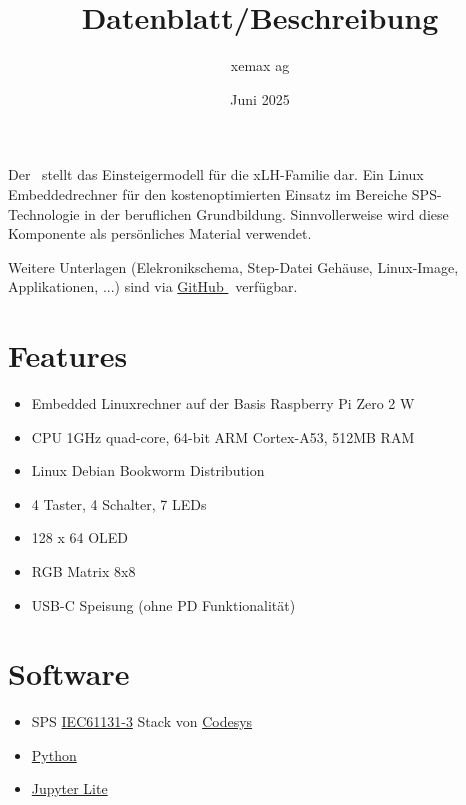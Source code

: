\documentclass[10pt]{datasheet}
\title{Datenblatt/Beschreibung \xlhPlattformID}
\author{xemax ag}
\date{Juni 2025}
\begin{document}
\maketitle



Der \textbf{\xlhPlattformID}\ stellt das Einsteigermodell für die xLH-Familie dar.
Ein Linux Embeddedrechner für den kostenoptimierten Einsatz im Bereiche SPS-Technologie in der beruflichen Grundbildung.
Sinnvollerweise wird diese Komponente als persönliches Material verwendet.

Weitere Unterlagen (Elekronikschema, Step-Datei Gehäuse, Linux-Image, Applikationen, ...) sind via
\href{https://github.com/xemax-ag/xLH/}{GitHub \xlhPlattformID}\ verfügbar.

\section{Features}

\begin{itemize}
    \item Embedded Linuxrechner auf der Basis Raspberry Pi Zero 2 W
    \item CPU 1GHz quad-core, 64-bit ARM Cortex-A53, 512MB RAM
    \item Linux Debian Bookworm Distribution
    \item 4 Taster, 4 Schalter, 7 LEDs
    \item 128 x 64 OLED
    \item RGB Matrix 8x8
    \item USB-C Speisung (ohne PD Funktionalität)
\end{itemize}

\section{Software}

\begin{itemize}
    \item SPS \href{https://de.wikipedia.org/wiki/EN_61131}{IEC61131-3} Stack von \href{https://www.codesys.com/}{Codesys}
    \item \href{https://www.python.org/}{Python}
    \item \href{https://jupyter.org/try-jupyter/lab/}{Jupyter Lite}
\end{itemize}
\end{document}
